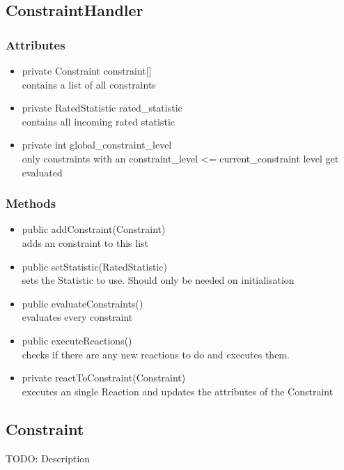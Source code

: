 
\subsection{ConstraintHandler}
\subsubsection{Attributes}
\begin{itemize}
	\item private  Constraint constraint[]\\
	contains a list of all constraints
	\item private  RatedStatistic rated\_statistic\\
	contains all incoming rated statistic
	\item private  int global\_constraint\_level\\
	only constraints with an constraint\_level <= current\_constraint level get evaluated
\end{itemize}
\subsubsection{Methods}
\begin{itemize}
	\item public addConstraint(Constraint) \\
	adds an constraint to this list
	\item public setStatistic(RatedStatistic) \\
	sets the Statistic to use. Should only be needed on initialisation
	\item public evaluateConstraints() \\
	evaluates every constraint
	\item public executeReactions() \\
	checks if there are any new reactions to do and executes them.
	\item private reactToConstraint(Constraint) \\
	executes an single Reaction and updates the attributes of the Constraint
\end{itemize}

\subsection{Constraint }
TODO: Description

